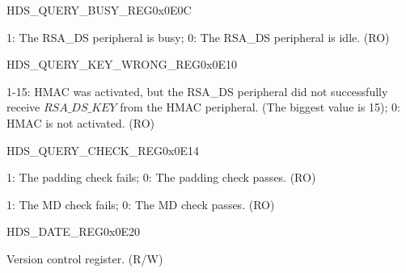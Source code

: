 \begin{register}{H}{DS\_QUERY\_BUSY\_REG}{0x0E0C}\label{regdesc:DSQUERYBUSYREG}
%
%
\regnewline%
\begin{regdesc}\begin{reglist}
\item [DS\_QUERY\_BUSY] 1: The RSA\_DS peripheral is busy; 0: The RSA\_DS peripheral is idle. (RO)
\end{reglist}\end{regdesc}
\end{register}



\begin{register}{H}{DS\_QUERY\_KEY\_WRONG\_REG}{0x0E10}\label{regdesc:DSQUERYKEYWRONGREG}
%
%
\regnewline%
\begin{regdesc}\begin{reglist}
\item [DS\_QUERY\_KEY\_WRONG] 1-15: HMAC was activated, but the RSA\_DS peripheral did not successfully receive \begin{math}RSA\_DS\_KEY\end{math} from the HMAC peripheral. (The biggest value is 15); 0: HMAC is not activated. (RO)
\end{reglist}\end{regdesc}
\end{register}




\begin{register}{H}{DS\_QUERY\_CHECK\_REG}{0x0E14}\label{regdesc:DSQUERYCHECKREG}
%
%
%
\regnewline%
\begin{regdesc}\begin{reglist}
\item [DS\_PADDING\_BAD] 1: The padding check fails; 0: The padding check passes. (RO)
\item [DS\_MD\_ERROR] 1: The MD check fails; 0: The MD check passes. (RO)
\end{reglist}\end{regdesc}
\end{register}




\begin{register}{H}{DS\_DATE\_REG}{0x0E20}\label{regdesc:DSDATEREG}
%
%
\regnewline%
\begin{regdesc}\begin{reglist}
\item [DS\_DATE] Version control register. (R/W)
\end{reglist}\end{regdesc}
\end{register}
